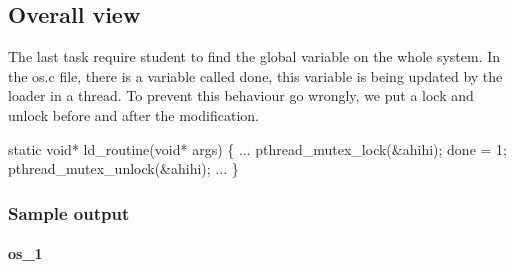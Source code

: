 \documentclass[]{article}
\newenvironment{Shaded}{}{}
\newcommand{\DataTypeTok}[1]{\textcolor[rgb]{0.56,0.13,0.00}{#1}}
\newcommand{\NormalTok}[1]{#1}
\let\oldparagraph\paragraph
\renewcommand{\paragraph}[1]{\oldparagraph{#1}\mbox{}}
\begin{document}
\subsection{Overall view}\label{overall-view}

The last task require student to find the global variable on the whole system.
In the os.c file, there is a variable called done, this variable is being updated
by the loader in a thread. To prevent this behaviour go wrongly, we put a lock and
unlock before and after the modification.

\begin{Shaded}
\begin{Highlighting}[]
\DataTypeTok{static} \DataTypeTok{void}\NormalTok{* ld_routine(}\DataTypeTok{void}\NormalTok{* args) \{}
\NormalTok{    ...}
\NormalTok{    pthread_mutex_lock(&ahihi);}
\NormalTok{    done = 1;}
\NormalTok{    pthread_mutex_unlock(&ahihi);}
\NormalTok{    ...}
\NormalTok{\}}
\end{Highlighting}
\end{Shaded}

\subsubsection{Sample output}

\paragraph{os\_1}\label{os1}
\end{document}
